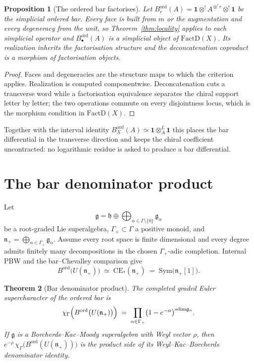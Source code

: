 \documentclass[11pt,reqno]{amsart}
\newtheorem{theorem}{Theorem}[section]
\newtheorem{proposition}[theorem]{Proposition}
\theoremstyle{definition}
\theoremstyle{remark}
\providecommand{\Sym}{\mathrm{Sym}}
\providecommand{\FactD}{\mathrm{FactD}}
\providecommand{\sdim}{\mathrm{sdim}}
\providecommand{\CE}{\mathrm{CE}}
\providecommand{\unit}{\mathbf{1}}
\begin{document}
\begin{proposition}[The ordered bar factorises]
\label{prop:bar-factorises}
Let $B^{\mathrm{ord}}_r(A) = \unit\otimes^! A^{\otimes^! r}\otimes^!\unit$
be the simplicial ordered bar. Every face is built from $m$ or the
augmentation and every degeneracy from the unit, so
Theorem~\ref{thm:locality} applies to each simplicial operator and
$B^{\mathrm{ord}}_\bullet(A)$ is a simplicial object of $\FactD(X)$. Its
realization inherits the factorisation structure and the
deconcatenation coproduct is a morphism of factorisation objects.
\end{proposition}

\begin{proof}
Faces and degeneracies are the structure maps to which the criterion
applies. Realization is computed componentwise. Deconcatenation cuts a
transverse word while a factorisation equivalence separates the chiral
support letter by letter; the two operations commute on every
disjointness locus, which is the morphism condition in $\FactD(X)$.
\end{proof}

Together with the interval identity
$B^{\mathrm{ord}}_X(A)\simeq\unit\otimes^{L}_A\unit$ this places the bar
differential in the transverse direction and keeps the chiral coefficient
uncontracted: no logarithmic residue is asked to produce a bar
differential.

\section{The bar denominator product}

Let
\[
  \mathfrak g = \mathfrak h \oplus
  \bigoplus_{\alpha\in\Gamma\setminus\{0\}} \mathfrak g_\alpha
\]
be a root-graded Lie superalgebra, $\Gamma_+\subset\Gamma$ a positive
monoid, and $\mathfrak n_+ = \bigoplus_{\alpha\in\Gamma_+}\mathfrak
g_\alpha$. Assume every root space is finite dimensional and every degree
admits finitely many decompositions in the chosen $\Gamma_+$-adic
completion. Internal PBW and the bar--Chevalley comparison give
\[
  B^{\mathrm{ord}}\bigl(U(\mathfrak n_+)\bigr)
  \;\simeq\; \CE_*(\mathfrak n_+)
  \;=\; \Sym\bigl(\mathfrak n_+[1]\bigr).
\]

\begin{theorem}[Bar denominator product]
\label{thm:bar-denominator}
The completed graded Euler supercharacter of the ordered bar is
\[
  \chi_\Gamma\Bigl(B^{\mathrm{ord}}\bigl(U(\mathfrak n_+)\bigr)\Bigr)
  \;=\;
  \prod_{\alpha\in\Gamma_+}\bigl(1-e^{-\alpha}\bigr)^{\sdim\mathfrak g_\alpha}.
\]
If $\mathfrak g$ is a Borcherds--Kac--Moody superalgebra with Weyl vector
$\rho$, then
$e^{-\rho}\,\chi_\Gamma\bigl(B^{\mathrm{ord}}(U(\mathfrak n_+))\bigr)$
is the product side of its Weyl--Kac--Borcherds denominator identity.
\end{theorem}
\end{document}
